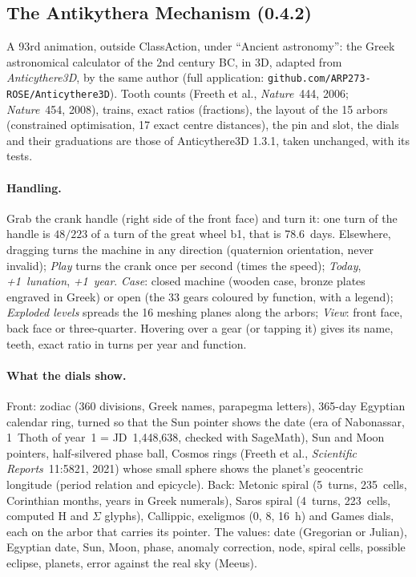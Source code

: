 \subsection{The Antikythera Mechanism (0.4.2)}\label{sec:anticythere}
A 93rd animation, outside ClassAction, under “Ancient astronomy”: the Greek astronomical calculator of the 2nd century
BC, in 3D, adapted from \emph{Anticythere3D}, by the same author (full application:
\texttt{github.com/ARP273-ROSE/Anticythere3D}). Tooth counts (Freeth et al., \emph{Nature}~444, 2006;
\emph{Nature}~454, 2008), trains, exact ratios (fractions), the layout of the 15 arbors (constrained optimisation, 17
exact centre distances), the pin and slot, the dials and their graduations are those of Anticythere3D 1.3.1, taken
unchanged, with its tests.

\paragraph{Handling.} Grab the crank handle (right side of the front face) and turn it: one turn of the handle is
$48/223$ of a turn of the great wheel b1, that is 78.6~days. Elsewhere, dragging turns the machine in any direction
(quaternion orientation, never invalid); \emph{Play} turns the crank once per second (times the speed);
\emph{Today}, \emph{+1~lunation}, \emph{+1~year}. \emph{Case}: closed machine (wooden case, bronze plates engraved in
Greek) or open (the 33 gears coloured by function, with a legend); \emph{Exploded levels} spreads the 16 meshing planes
along the arbors; \emph{View}: front face, back face or three-quarter. Hovering over a gear (or tapping it) gives its
name, teeth, exact ratio in turns per year and function.

\paragraph{What the dials show.} Front: zodiac (360 divisions, Greek names, parapegma letters), 365-day Egyptian
calendar ring, turned so that the Sun pointer shows the date (era of Nabonassar, 1~Thoth of year~1 = JD~1,448,638,
checked with SageMath), Sun and Moon pointers, half-silvered phase ball, Cosmos rings (Freeth et al.,
\emph{Scientific Reports}~11:5821, 2021) whose small sphere shows the planet's geocentric longitude (period relation
and epicycle). Back: Metonic spiral (5~turns, 235~cells, Corinthian months, years in Greek numerals), Saros spiral
(4~turns, 223~cells, computed $\mathrm{H}$ and $\Sigma$ glyphs), Callippic, exeligmos (0, 8, 16~h) and Games dials, each on the arbor
that carries its pointer. The values: date (Gregorian or Julian), Egyptian date, Sun, Moon, phase, anomaly correction,
node, spiral cells, possible eclipse, planets, error against the real sky (Meeus).

